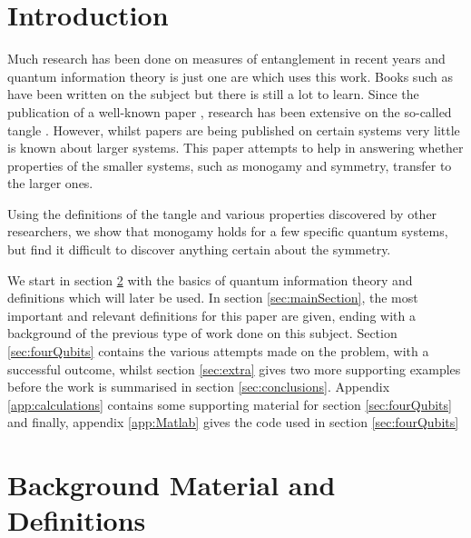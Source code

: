 \documentclass[12pt,a4paper]{article}
\numberwithin{equation}{section}
\begin{document}
\newpage

\tableofcontents

\newpage











\section{Introduction}
\label{sec:intro}

Much research has been done on measures of entanglement in recent years and quantum information theory is just one are which uses this work. Books such as \cite{NielsenChuang} have been written on the subject but there is still a lot to learn. Since the publication of a well-known paper \cite{CKW}, research has been extensive on the so-called tangle \cite{OV} \cite{LOSU}. However, whilst papers are being published on certain systems \cite{EOSU} very little is known about larger systems. This paper attempts to help in answering whether properties of the smaller systems, such as monogamy and symmetry, transfer to the larger ones.

Using the definitions of the tangle and various properties discovered by other researchers, we show that monogamy holds for a few specific quantum systems, but find it difficult to discover anything certain about the symmetry.

We start in section \ref{sec:background} with the basics of quantum information theory and definitions which will later be used. In section \ref{sec:mainSection}, the most important and relevant definitions for this paper are given, ending with a background of the previous type of work done on this subject. Section \ref{sec:fourQubits} contains the various attempts made on the problem, with a successful outcome, whilst section \ref{sec:extra} gives two more supporting examples before the work is summarised in section \ref{sec:conclusions}. Appendix \ref{app:calculations} contains some supporting material for section \ref{sec:fourQubits} and finally, appendix \ref{app:Matlab} gives the code used in section \ref{sec:fourQubits}

\newpage






\section{Background Material and Definitions}
\label{sec:background}
\end{document}
